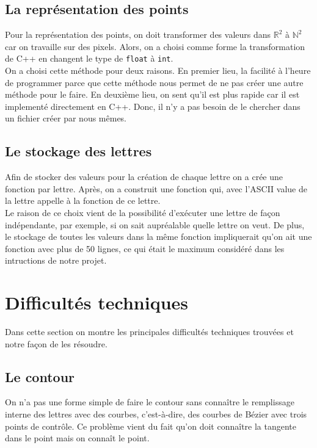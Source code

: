 \documentclass[11pt,a4paper]{article}
\begin{document}
	\subsection{La représentation des points}
	Pour la représentation des points, on doit transformer des valeurs dans $\mathbb{R}^2$ à $\mathbb{N}^2$ car on travaille sur des pixels. Alors, on a choisi comme forme la transformation de C++ en changent le type de \texttt{float} à \texttt{int}.\\
	
	On a choisi cette méthode pour deux raisons. En premier lieu, la facilité à l'heure de programmer parce que cette méthode nous permet de ne pas créer une autre méthode pour le faire. En deuxième lieu, on sent qu'il est plus rapide car il est implementé directement en C++. Donc, il n'y a pas besoin de le chercher dans un fichier créer par nous mêmes.
	
	\subsection{Le stockage des lettres}
	Afin de stocker des valeurs pour la création de chaque lettre on a crée une fonction par lettre. Après, on a construit une fonction qui, avec l'ASCII value de la lettre appelle à la fonction de ce lettre.\\
	
	Le raison de ce choix vient de la possibilité d'exécuter une lettre de façon indépendante, par exemple, si on sait aupréalable quelle lettre on veut. De plus, le stockage de toutes les valeurs dans la même fonction impliquerait qu'on ait une fonction avec plus de 50 lignes, ce qui était le maximum considéré dans les intructions de notre projet. 
	
	\newpage
	\section{Difficultés techniques}
	Dans cette section on montre les principales difficultés techniques trouvées et notre façon de les résoudre.
	
	\subsection{Le contour}
	On n'a pas une forme simple de faire le contour sans connaître le remplissage interne des lettres avec des courbes, c'est-à-dire, des courbes de Bézier avec trois points de contrôle. Ce problème vient du fait qu'on doit connaître la tangente dans le point mais on connaît le point.\\
	
\end{document}

